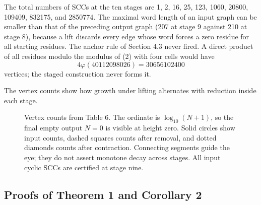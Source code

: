 \documentclass[11pt,reqno]{amsart}
\theoremstyle{definition}
\theoremstyle{remark}
\begin{document}
The total numbers of SCCs at the ten stages are 1, 2, 16, 25, 123, 1060,
20800, 109409, 832175, and 2850774. The maximal word length of an input
graph can be smaller than that of the preceding output graph (207 at
stage 9 against 210 at stage 8), because a lift discards every edge whose
word forces a zero residue for all starting residues. The anchor rule of
Section 4.3 never fired. A direct product of all residues modulo the
modulus of (2) with four cells would have
\[
4\varphi(40112098026)=30656102400
\]
vertices; the staged construction
never forms it.

The vertex counts show how growth under lifting alternates with reduction inside each stage.

\begin{figure}[htbp]
\centering

\caption{Vertex counts from Table 6. The ordinate is \(\log_{10}(N+1)\), so the final empty output \(N=0\) is visible at height zero. Solid circles show input counts, dashed squares counts after removal, and dotted diamonds counts after contraction. Connecting segments guide the eye; they do not assert monotone decay across stages. All input cyclic SCCs are certified at stage nine.}
\label{fig:stage-counts}
\end{figure}

\subsection{Proofs of Theorem 1 and Corollary 2}\label{sec:5.4}
\end{document}
